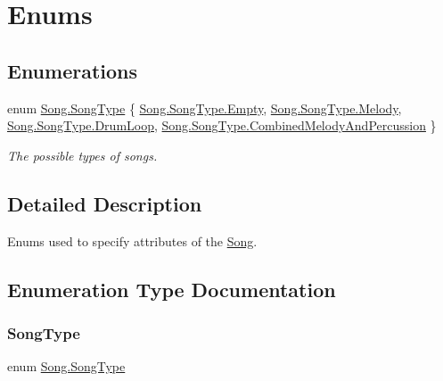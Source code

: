 \hypertarget{group___song_enums}{}\section{Enums}
\label{group___song_enums}
\subsection*{Enumerations}
\begin{DoxyCompactItemize}
\item 
enum \hyperlink{group___song_enums_gae681a1f001333e39fc1cb4fea97bfe1b}{Song.\+Song\+Type} \{ \hyperlink{group___song_enums_ggae681a1f001333e39fc1cb4fea97bfe1bace2c8aed9c2fa0cfbed56cbda4d8bf07}{Song.\+Song\+Type.\+Empty}, 
\hyperlink{group___song_enums_ggae681a1f001333e39fc1cb4fea97bfe1bace2f3a5579d231b3b8f8b9e5fc46d361}{Song.\+Song\+Type.\+Melody}, 
\hyperlink{group___song_enums_ggae681a1f001333e39fc1cb4fea97bfe1ba150deef06b13ddaeac61d0d2699ec61e}{Song.\+Song\+Type.\+Drum\+Loop}, 
\hyperlink{group___song_enums_ggae681a1f001333e39fc1cb4fea97bfe1ba5130447d9fcb867ce341b3d17b117ced}{Song.\+Song\+Type.\+Combined\+Melody\+And\+Percussion}
 \}\begin{DoxyCompactList}\small\item\em The possible types of songs. \end{DoxyCompactList}
\end{DoxyCompactItemize}


\subsection{Detailed Description}
Enums used to specify attributes of the \hyperlink{class_song}{Song}. 

\subsection{Enumeration Type Documentation}
\mbox{\label{group___song_enums_gae681a1f001333e39fc1cb4fea97bfe1b}} 
\subsubsection{\texorpdfstring{Song\+Type}{SongType}}
{\footnotesize\ttfamily enum \hyperlink{group___song_enums_gae681a1f001333e39fc1cb4fea97bfe1b}{Song.\+Song\+Type}\hspace{0.3cm}{\ttfamily [strong]}}



